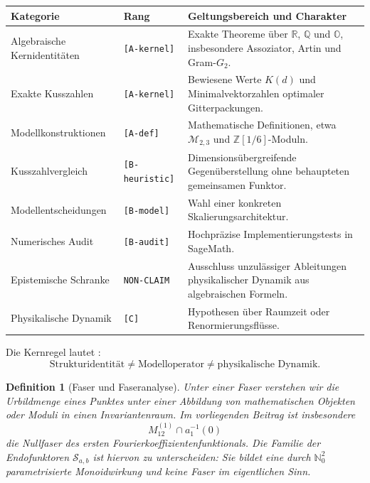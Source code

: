 \documentclass[11pt,a4paper]{article}
\newtheorem{definition}[theorem]{Definition}
\newcommand{\Mmon}{\mathcal{M}_{2,3}}
\begin{document}
\begin{table}[h!]
\centering
\begin{tabularx}{\textwidth}{@{}p{}p{}X@{}}
\toprule
\textbf{Kategorie} & \textbf{Rang} & \textbf{Geltungsbereich und Charakter} \\
\midrule
Algebraische Kernidentitäten & \texttt{[A-kernel]} & Exakte Theoreme über $\mathbb{R}$, $\mathbb{Q}$ und $\mathbb{O}$, insbesondere Assoziator, Artin und Gram-$G_2$. \\
Exakte Kusszahlen & \texttt{[A-kernel]} & Bewiesene Werte $K(d)$ und Minimalvektorzahlen optimaler Gitterpackungen. \\
Modellkonstruktionen & \texttt{[A-def]} & Mathematische Definitionen, etwa $\Mmon$ und $\mathbb{Z}[1/6]$-Moduln. \\
Kusszahlvergleich & \texttt{[B-heuristic]} & Dimensionsübergreifende Gegenüberstellung ohne behaupteten gemeinsamen Funktor. \\
Modellentscheidungen & \texttt{[B-model]} & Wahl einer konkreten Skalierungsarchitektur. \\
Numerisches Audit & \texttt{[B-audit]} & Hochpräzise Implementierungstests in SageMath. \\
Epistemische Schranke & \texttt{NON-CLAIM} & Ausschluss unzulässiger Ableitungen physikalischer Dynamik aus algebraischen Formeln. \\
Physikalische Dynamik & \texttt{[C]} & Hypothesen über Raumzeit oder Renormierungsflüsse. \\
\bottomrule
\end{tabularx}
\end{table}

Die Kernregel lautet \cite{eabcAudit}:
\begin{equation}
\text{Strukturidentität}\neq\text{Modelloperator}\neq\text{physikalische Dynamik}.
\end{equation}

\begin{definition}[Faser und Faseranalyse]
Unter einer \emph{Faser} verstehen wir die Urbildmenge eines Punktes unter einer Abbildung von mathematischen Objekten oder Moduli in einen Invariantenraum. Im vorliegenden Beitrag ist insbesondere
\[
M_{12}^{(1)}\cap a_1^{-1}(0)
\]
die Nullfaser des ersten Fourierkoeffizientenfunktionals. Die Familie der Endofunktoren $\mathscr{S}_{a,b}$ ist hiervon zu unterscheiden: Sie bildet eine durch $\mathbb{N}_0^2$ parametrisierte Monoidwirkung und keine Faser im eigentlichen Sinn.
\end{definition}
\end{document}
